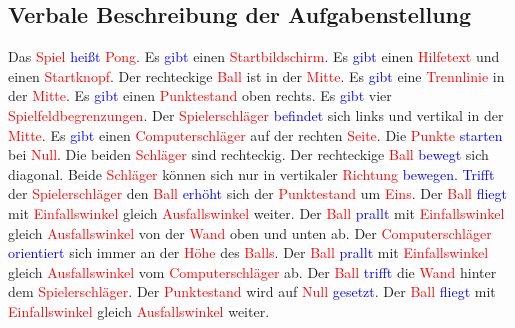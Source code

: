 \documentclass[a4paper,12pt]{article}
\begin{document}
\subsection{Verbale Beschreibung der Aufgabenstellung}
Das \textcolor{red}{Spiel} \textcolor{blue}{heißt} \textcolor{red}{Pong}. Es \textcolor{blue}{gibt} einen \textcolor{red}{Startbildschirm}. Es \textcolor{blue}{gibt} einen \textcolor{red}{Hilfetext} und einen \textcolor{red}{Startknopf}. Der rechteckige \textcolor{red}{Ball} ist in der \textcolor{red}{Mitte}. Es \textcolor{blue}{gibt} eine \textcolor{red}{Trennlinie} in der \textcolor{red}{Mitte}. Es \textcolor{blue}{gibt} einen \textcolor{red}{Punktestand} oben rechts. Es \textcolor{blue}{gibt} vier \textcolor{red}{Spielfeldbegrenzungen}. Der \textcolor{red}{Spielerschläger} \textcolor{blue}{befindet} sich links und vertikal in der \textcolor{red}{Mitte}. Es \textcolor{blue}{gibt} einen \textcolor{red}{Computerschläger} auf der rechten \textcolor{red}{Seite}. Die \textcolor{red}{Punkte} \textcolor{blue}{starten} bei \textcolor{red}{Null}. Die beiden \textcolor{red}{Schläger} sind rechteckig. Der rechteckige \textcolor{red}{Ball} \textcolor{blue}{bewegt} sich diagonal. Beide \textcolor{red}{Schläger} können sich nur in vertikaler \textcolor{red}{Richtung} \textcolor{blue}{bewegen}. \textcolor{blue}{Trifft} der \textcolor{red}{Spielerschläger} den \textcolor{red}{Ball} \textcolor{blue}{erhöht} sich der \textcolor{red}{Punktestand} um \textcolor{red}{Eins}. Der \textcolor{red}{Ball} \textcolor{blue}{fliegt} mit \textcolor{red}{Einfallswinkel} gleich \textcolor{red}{Ausfallswinkel} weiter. Der \textcolor{red}{Ball} \textcolor{blue}{prallt} mit \textcolor{red}{Einfallswinkel} gleich \textcolor{red}{Ausfallswinkel} von der \textcolor{red}{Wand} oben und unten ab. Der \textcolor{red}{Computerschläger} \textcolor{blue}{orientiert} sich immer an der \textcolor{red}{Höhe} des \textcolor{red}{Balls}. Der \textcolor{red}{Ball} \textcolor{blue}{prallt} mit \textcolor{red}{Einfallswinkel} gleich \textcolor{red}{Ausfallswinkel} vom \textcolor{red}{Computerschläger} ab. Der \textcolor{red}{Ball} \textcolor{blue}{trifft} die \textcolor{red}{Wand} hinter dem \textcolor{red}{Spielerschläger}. Der \textcolor{red}{Punktestand} wird auf \textcolor{red}{Null} \textcolor{blue}{gesetzt}. Der \textcolor{red}{Ball} \textcolor{blue}{fliegt} mit \textcolor{red}{Einfallswinkel} gleich \textcolor{red}{Ausfallswinkel} weiter.
\clearpage
\end{document}
